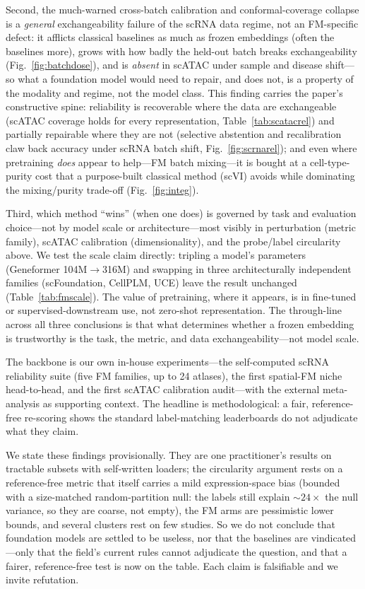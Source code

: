 \documentclass[fleqn,10pt,lineno]{wlpeerj}  %
\begin{document}
Second, the much-warned cross-batch calibration and conformal-coverage collapse is a \emph{general} exchangeability failure of the scRNA data regime, not an FM-specific defect: it afflicts classical baselines as much as frozen embeddings (often the baselines more), grows with how badly the held-out batch breaks exchangeability (Fig.~\ref{fig:batchdose}), and is \emph{absent} in scATAC under sample and disease shift---so what a foundation model would need to repair, and does not, is a property of the modality and regime, not the model class. This finding carries the paper's constructive spine: reliability is recoverable where the data are exchangeable (scATAC coverage holds for every representation, Table~\ref{tab:scatacrel}) and partially repairable where they are not (selective abstention and recalibration claw back accuracy under scRNA batch shift, Fig.~\ref{fig:scrnarel}); and even where pretraining \emph{does} appear to help---FM batch mixing---it is bought at a cell-type-purity cost that a purpose-built classical method (scVI) avoids while dominating the mixing/purity trade-off (Fig.~\ref{fig:integ}).

Third, which method ``wins'' (when one does) is governed by task and evaluation choice---not by model scale or architecture---most visibly in perturbation (metric family), scATAC calibration (dimensionality), and the probe/label circularity above. We test the scale claim directly: tripling a model's parameters (Geneformer 104M$\to$316M) and swapping in three architecturally independent families (scFoundation, CellPLM, UCE) leave the result unchanged (Table~\ref{tab:fmscale}). The value of pretraining, where it appears, is in fine-tuned or supervised-downstream use, not zero-shot representation. The through-line across all three conclusions is that what determines whether a frozen embedding is trustworthy is the task, the metric, and data exchangeability---not model scale.

The backbone is our own in-house experiments---the self-computed scRNA reliability suite (five FM families, up to 24 atlases), the first spatial-FM niche head-to-head, and the first scATAC calibration audit---with the external meta-analysis as supporting context. The headline is methodological: a fair, reference-free re-scoring shows the standard label-matching leaderboards do not adjudicate what they claim.

We state these findings provisionally. They are one practitioner's results on tractable subsets with self-written loaders; the circularity argument rests on a reference-free metric that itself carries a mild expression-space bias (bounded with a size-matched random-partition null: the labels still explain ${\sim}24\times$ the null variance, so they are coarse, not empty), the FM arms are pessimistic lower bounds, and several clusters rest on few studies. So we do not conclude that foundation models are settled to be useless, nor that the baselines are vindicated---only that the field's current rules cannot adjudicate the question, and that a fairer, reference-free test is now on the table. Each claim is falsifiable and we invite refutation.
\end{document}
